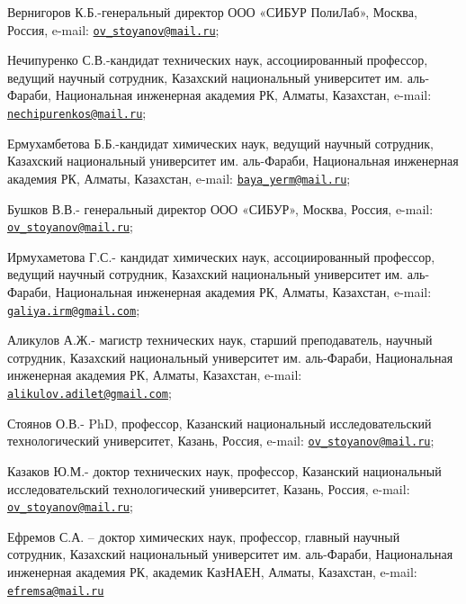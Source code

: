 \begin{authorinfo}
Вернигоров К.Б.-генеральный директор ООО «СИБУР ПолиЛаб», Москва,
Россия, e-mail:
\href{mailto:ov_stoyanov@mail.ru}{\nolinkurl{ov\_stoyanov@mail.ru}};

Нечипуренко С.В.-кандидат технических наук, ассоциированный профессор,
ведущий научный сотрудник, Казахский национальный университет им.
аль-Фараби, Национальная инженерная академия РК, Алматы, Казахстан,
e-mail:
\href{mailto:nechipurenkos@mail.ru}{\nolinkurl{nechipurenkos@mail.ru}};

Ермухамбетова Б.Б.-кандидат химических наук, ведущий научный сотрудник,
Казахский национальный университет им. аль-Фараби, Национальная
инженерная академия РК, Алматы, Казахстан, e-mail:
\href{mailto:baya_yerm@mail.ru}{\nolinkurl{baya\_yerm@mail.ru}};

Бушков В.В.- генеральный директор ООО «СИБУР», Москва, Россия, e-mail:
\href{mailto:ov_stoyanov@mail.ru}{\nolinkurl{ov\_stoyanov@mail.ru}};

Ирмухаметова Г.С.- кандидат химических наук, ассоциированный профессор,
ведущий научный сотрудник, Казахский национальный университет им.
аль-Фараби, Национальная инженерная академия РК, Алматы, Казахстан,
e-mail:
\href{mailto:galiya.irm@gmail.com}{\nolinkurl{galiya.irm@gmail.com}};

Аликулов А.Ж.- магистр технических наук, старший преподаватель, научный
сотрудник, Казахский национальный университет им. аль-Фараби,
Национальная инженерная академия РК, Алматы, Казахстан, e-mail:
\href{mailto:alikulov.adilet@gmail.com}{\nolinkurl{alikulov.adilet@gmail.com}};

Стоянов О.В.- PhD, профессор, Казанский национальный исследовательский
технологический университет, Казань, Россия, e-mail:
\href{mailto:ov_stoyanov@mail.ru}{\nolinkurl{ov\_stoyanov@mail.ru}};

Казаков Ю.М.- доктор технических наук, профессор, Казанский национальный
исследовательский технологический университет, Казань, Россия, e-mail:
\href{mailto:ov_stoyanov@mail.ru}{\nolinkurl{ov\_stoyanov@mail.ru}};

Ефремов С.А. -- доктор химических наук, профессор, главный научный
сотрудник, Казахский национальный университет им. аль-Фараби,
Национальная инженерная академия РК, академик КазНАЕН, Алматы,
Казахстан, e-mail:
\href{mailto:efremsa@mail.ru}{\nolinkurl{efremsa@mail.ru}}
\end{authorinfo}
